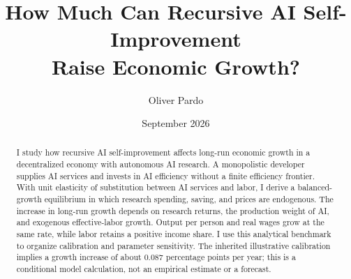 \documentclass[11pt]{article}
\title{How Much Can Recursive AI Self-Improvement\\Raise Economic Growth?}
\author{Oliver Pardo}
\date{September 2026}
\begin{document}
\maketitle
\begin{abstract}
I study how recursive AI self-improvement affects long-run economic growth
in a decentralized economy with autonomous AI research. A monopolistic
developer supplies AI services and invests in AI efficiency without a finite
efficiency frontier. With unit elasticity of substitution between AI services
and labor, I derive a balanced-growth equilibrium in which research spending,
saving, and prices are endogenous. The increase in long-run growth depends on
research returns, the production weight of AI, and exogenous effective-labor
growth. Output per person and real wages grow at the same rate, while labor
retains a positive income share. I use this analytical benchmark to organize
calibration and parameter sensitivity. The inherited illustrative calibration
implies a growth increase of about 0.087 percentage points per year; this is
a conditional model calculation, not an empirical estimate or a forecast.
\end{abstract}
\onehalfspacing





\appendix



\end{document}

